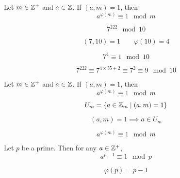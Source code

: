 \begin{frame}
  \begin{theorem}
    Let $m \in \mathbb{Z}^{+}$ and $a \in \mathbb{Z}$.
    If $(a, m) = 1$, then
    \[
      a^{\varphi(m)} \equiv 1 \mod{m}
    \]
  \end{theorem}

  \pause
  \[
    7^{222} \mod{10}
  \]

  \pause
  \[
    (7, 10) = 1 \qquad \varphi(10) = 4
  \]

  \pause
  \[
    7^{4} \equiv 1 \mod{10}
  \]

  \pause
  \[
    7^{222} \equiv 7^{4 \times 55 + 2} \equiv 7^{2} \equiv 9 \mod{10}
  \]
\end{frame}

\begin{frame}
  \begin{theorem}
    Let $m \in \mathbb{Z}^{+}$ and $a \in \mathbb{Z}$.
    If $(a, m) = 1$, then
    \[
      a^{\varphi(m)} \equiv 1 \mod{m}
    \]
  \end{theorem}

  \pause
  \vspace{0.30cm}
  \[
    U_{m} = \{a \in \mathbb{Z}_{m} \mid (a, m) = 1\}
  \]

  \pause
  \[
    (a, m) = 1 \implies a \in U_{m}
  \]

  \pause
  \[
    a^{\varphi(m)} \equiv 1 \mod{m}
  \]
\end{frame}

\begin{frame}
  \begin{theorem}
    Let $p$ be a prime. Then for any $a \in \mathbb{Z}^{+}$,
    \[
      a^{p-1} \equiv 1 \mod{p}
    \]
  \end{theorem}

  \pause
  \[
    \varphi(p) = p - 1
  \]
\end{frame}
